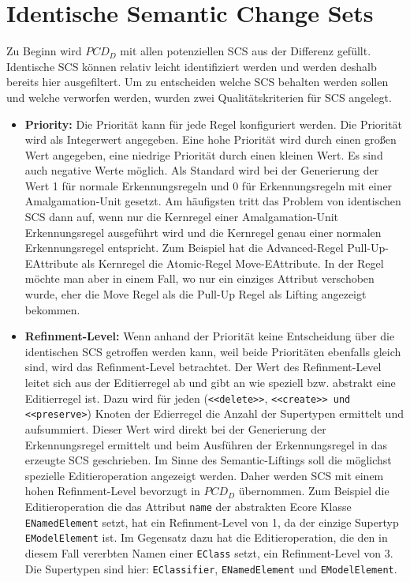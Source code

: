 \section{Identische Semantic Change Sets}

Zu Beginn wird $PCD_D$ mit allen potenziellen SCS aus der Differenz gefüllt. Identische SCS können
relativ leicht identifiziert werden und werden deshalb bereits hier ausgefiltert. Um zu entscheiden
welche SCS behalten werden sollen und welche verworfen werden, wurden zwei Qualitätskriterien für
SCS angelegt.

\begin{itemize}
  \item \textbf{Priority:} Die Priorität kann für jede Regel konfiguriert werden. Die Priorität wird
  als Integerwert angegeben. Eine hohe Priorität wird durch einen großen Wert angegeben, eine
  niedrige Priorität durch einen kleinen Wert. Es sind auch negative Werte möglich. Als Standard
  wird bei der Generierung der Wert 1 für normale Erkennungsregeln und 0 für Erkennungsregeln mit
  einer Amalgamation-Unit gesetzt. Am häufigsten tritt das Problem von identischen SCS dann auf,
  wenn nur die Kernregel einer Amalgamation-Unit Erkennungsregel ausgeführt wird und die Kernregel genau
  einer normalen Erkennungsregel entspricht. Zum Beispiel hat die Advanced-Regel Pull-Up-EAttribute
  als Kernregel die Atomic-Regel Move-EAttribute. In der Regel möchte man aber in einem Fall, wo nur
  ein einziges Attribut verschoben wurde, eher die Move Regel als die Pull-Up Regel als Lifting
  angezeigt bekommen.
 
  \item \textbf{Refinment-Level:} Wenn anhand der Priorität keine Entscheidung über die identischen
  SCS getroffen werden kann, weil beide Prioritäten ebenfalls gleich sind, wird das Refinment-Level
  betrachtet. Der Wert des Refinment-Level leitet sich aus der Editierregel ab und  gibt an wie
  speziell bzw. abstrakt eine Editierregel ist. Dazu wird für jeden (\texttt{<<delete>>},
  \texttt{<<create>> und \texttt{<<preserve>}}) Knoten der Edierregel die Anzahl der Supertypen
  ermittelt und aufsummiert. Dieser Wert wird direkt bei der Generierung der Erkennungsregel
  ermittelt und beim Ausführen der Erkennungsregel in das erzeugte SCS geschrieben. Im Sinne des
  Semantic-Liftings soll die möglichst spezielle Editieroperation angezeigt werden. Daher werden SCS
  mit einem hohen Refinment-Level bevorzugt in $PCD_D$ übernommen. Zum Beispiel die Editieroperation
  die das Attribut \texttt{name} der abstrakten Ecore Klasse \texttt{ENamedElement} setzt, hat ein
  Refinment-Level von 1, da der einzige Supertyp \texttt{EModelElement} ist. Im Gegensatz dazu hat
  die Editieroperation, die den in diesem Fall vererbten Namen einer \texttt{EClass} setzt, ein
  Refinment-Level von 3. Die Supertypen sind hier: \texttt{EClassifier}, \texttt{ENamedElement} und
  \texttt{EModelElement}.
\end{itemize}

